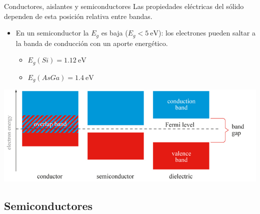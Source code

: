 \documentclass[xcolor={usenames,svgnames,dvipsnames}]{beamer}
\begin{document}
\begin{frame}[label={sec:org9a26ef9}]{Conductores, aislantes y semiconductores}
Las \alert{propiedades eléctricas} del sólido dependen de esta \alert{posición relativa entre bandas}.

\begin{itemize}
\item En un \alert{semiconductor} la \(E_{g}\) es baja (\(E_{g}<\SI{5}{\electronvolt}\)): los electrones pueden \guillemotleft{}saltar\guillemotright{} a la banda de conducción con un aporte energético.

\begin{itemize}
\item \(E_{g}(Si)=\SI{1.12}{\electronvolt}\)

\item \(E_{g}(AsGa)=\SI{1.4}{\electronvolt}\)
\end{itemize}
\end{itemize}

\begin{center}


\begin{center}
\includegraphics[width=.9\linewidth]{../figs/simplified_band_diagram.jpg}
\end{center}
\end{center}
\end{frame}

\subsection{Semiconductores}
\label{sec:org4aeb762}
\end{document}
